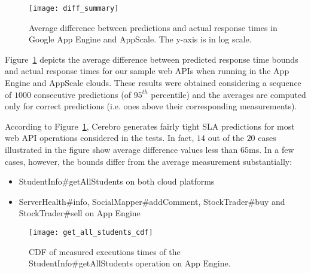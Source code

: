 \begin{figure}
\centering
\texttt{[image: diff\_summary]}
\caption{Average difference between predictions and actual response times in
Google App Engine and AppScale. The y-axis is in log scale.}
\label{fig:diff_summary}
\end{figure}

Figure~\ref{fig:diff_summary} depicts the average difference between predicted
response time bounds and actual response times for
our sample web APIs when running in the App Engine and AppScale clouds. 
These results were obtained considering a sequence of $1000$ 
consecutive predictions (of $95^{th}$ percentile) and the averages are
computed only for correct predictions (i.e. ones above their corresponding
measurements).

According to Figure~\ref{fig:diff_summary}, Cerebro generates fairly tight SLA predictions for most web API operations considered in the tests. In fact,
$14$ out of the $20$ cases illustrated in the figure show average difference
values less than $65$ms. In a few cases, however, the bounds differ from the
average measurement substantially:

\begin{itemize}
\item StudentInfo\#getAllStudents on both cloud platforms
\item ServerHealth\#info, SocialMapper\#addComment, StockTrader\#buy and StockTrader\#sell on App Engine
\end{itemize}


\begin{figure}
\centering
\texttt{[image: get\_all\_students\_cdf]}
\caption{CDF of measured executions times of the StudentInfo\#getAllStudents operation on App Engine.}
\label{fig:get_all_students_cdf}
\end{figure}

